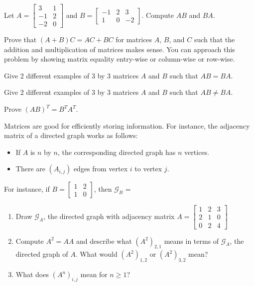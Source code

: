\bq Let $A=\begin{bmatrix} 3&1\\-1&2 \\-2 & 0 \end{bmatrix}$ and $B=\begin{bmatrix} -1&2&3\\1&0&-2  \end{bmatrix}$. Compute $AB$ and $BA$.
\eq

\bq Prove that $(A+B)C=AC+BC$ for matrices $A$, $B$, and $C$ such that the addition and multiplication of matrices makes sense. You can approach this problem by showing matrix equality entry-wise or column-wise or row-wise.
\eq

\bq Give 2 different examples of 3 by 3 matrices $A$ and $B$ such that $AB=BA$.
\eq

\bq Give 2 different examples of 3 by 3 matrices $A$ and $B$ such that $AB \neq BA$.
\eq

\bq
Prove $(AB)^T=B^T A^T$.
\eq
\begin{annotation}
\end{annotation}
\bq Matrices are good for efficiently storing information. For instance, the adjacency matrix of a directed graph works as follows:
\begin{itemize}
\item If $A$ is $n$ by $n$, the corresponding directed graph has $n$ vertices.
\item There are $(A_{i,j})$ edges from vertex $i$ to vertex $j$.
\end{itemize}
For instance, if $B = \left[ \begin{array}{ccc} 1 & 2 \\
                                    1 & 0 \end{array} \right] $, then $\mathcal G_B$ = \quad \quad {}
\begin{enumerate}
\item Draw $\mathcal G_A$, the directed graph with adjacency matrix $A = \left[ \begin{array}{ccc} 1 & 2 &3\\ 2& 1 & 0\\0 &2&4 \end{array} \right] $
\item Compute $A^2=AA$ and describe what $(A^2)_{2,1}$ means in terms of $\mathcal G_A$, the directed graph of $A$. What would $(A^2)_{1,2}$ or $(A^2)_{3,2}$ mean?
\item What does $(A^n)_{i,j}$ mean for $n \geq 1$?
\end{enumerate}
\eq

